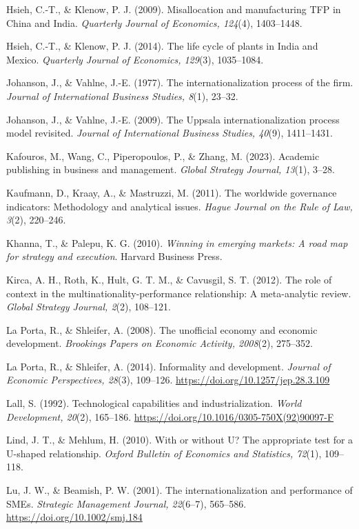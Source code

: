 \documentclass[
  a4paper,
  13pt]{extreport}
\begin{document}
Hsieh, C.-T., \& Klenow, P. J. (2009). Misallocation and manufacturing
TFP in China and India. \emph{Quarterly Journal of Economics, 124}(4),
1403--1448.

Hsieh, C.-T., \& Klenow, P. J. (2014). The life cycle of plants in India
and Mexico. \emph{Quarterly Journal of Economics, 129}(3), 1035--1084.

Johanson, J., \& Vahlne, J.-E. (1977). The internationalization process
of the firm. \emph{Journal of International Business Studies, 8}(1),
23--32.

Johanson, J., \& Vahlne, J.-E. (2009). The Uppsala internationalization
process model revisited. \emph{Journal of International Business
Studies, 40}(9), 1411--1431.

Kafouros, M., Wang, C., Piperopoulos, P., \& Zhang, M. (2023). Academic
publishing in business and management. \emph{Global Strategy Journal,
13}(1), 3--28.

Kaufmann, D., Kraay, A., \& Mastruzzi, M. (2011). The worldwide
governance indicators: Methodology and analytical issues. \emph{Hague
Journal on the Rule of Law, 3}(2), 220--246.

Khanna, T., \& Palepu, K. G. (2010). \emph{Winning in emerging markets:
A road map for strategy and execution}. Harvard Business Press.

Kirca, A. H., Roth, K., Hult, G. T. M., \& Cavusgil, S. T. (2012). The
role of context in the multinationality-performance relationship: A
meta-analytic review. \emph{Global Strategy Journal, 2}(2), 108--121.

La Porta, R., \& Shleifer, A. (2008). The unofficial economy and
economic development. \emph{Brookings Papers on Economic Activity,
2008}(2), 275--352.

La Porta, R., \& Shleifer, A. (2014). Informality and development.
\emph{Journal of Economic Perspectives, 28}(3), 109--126.
\url{https://doi.org/10.1257/jep.28.3.109}

Lall, S. (1992). Technological capabilities and industrialization.
\emph{World Development, 20}(2), 165--186.
\url{https://doi.org/10.1016/0305-750X(92)90097-F}

Lind, J. T., \& Mehlum, H. (2010). With or without U? The appropriate
test for a U-shaped relationship. \emph{Oxford Bulletin of Economics and
Statistics, 72}(1), 109--118.

Lu, J. W., \& Beamish, P. W. (2001). The internationalization and
performance of SMEs. \emph{Strategic Management Journal, 22}(6--7),
565--586. \url{https://doi.org/10.1002/smj.184}
\end{document}
